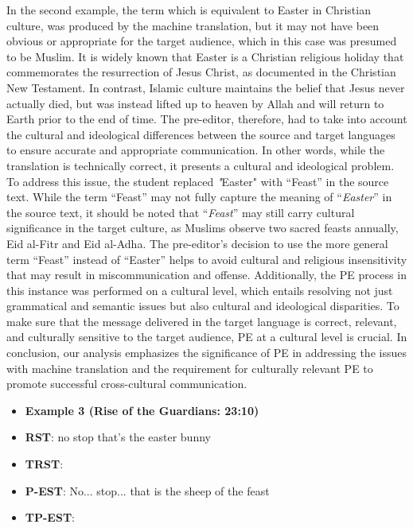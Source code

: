 \documentclass[english]{textolivre}
\begin{document}
In the second example, the term  which is equivalent to Easter in Christian culture, was produced by the machine translation, but it may not have been obvious or appropriate for the target audience, which in this case was presumed to be Muslim. It is widely known that Easter is a Christian religious holiday that commemorates the resurrection of Jesus Christ, as documented in the Christian New Testament. In contrast, Islamic culture maintains the belief that Jesus never actually died, but was instead lifted up to heaven by Allah and will return to Earth prior to the end of time. The pre-editor, therefore, had to take into account the cultural and ideological differences between the source and target languages to ensure accurate and appropriate communication. In other words, while the translation is technically correct, it presents a cultural and ideological problem. To address this issue, the student replaced \emph"{Easter}" with “Feast” in the source text. While the term “Feast” may not fully capture the meaning of “\emph{Easter}” in the source text, it should be noted that “\emph{Feast}” may still carry cultural significance in the target culture, as Muslims observe two sacred feasts annually, Eid al-Fitr and Eid al-Adha. The pre-editor’s decision to use the more general term “Feast” instead of “Easter” helps to avoid cultural and religious insensitivity that may result in miscommunication and offense. Additionally, the PE process in this instance was performed on a cultural level, which entails resolving not just grammatical and semantic issues but also cultural and ideological disparities. To make sure that the message delivered in the target language is correct, relevant, and culturally sensitive to the target audience, PE at a cultural level is crucial. In conclusion, our analysis emphasizes the significance of PE in addressing the issues with machine translation and the requirement for culturally relevant PE to promote successful cross-cultural communication.

\begin{itemize}
\item \textbf{Example 3 (Rise of the Guardians: 23:10)} 
\item \textbf{RST}: no stop that’s the easter bunny
\item \textbf{TRST}: 
\item \textbf{P-EST}: No... stop... that is the sheep of the feast
\item \textbf{TP-EST}: 
\end{itemize}
\end{document}
